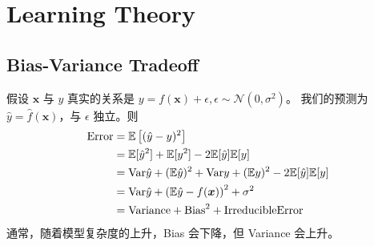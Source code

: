 \chapter{Learning Theory}
	\section{Bias-Variance Tradeoff}
		假设 $ \bm{x} $ 与 $ y $ 真实的关系是 $ y = f(\bm{x}) + \epsilon , \epsilon \sim \mathcal{N}(0, \sigma^2) $。
		我们的预测为 $ \hat{y} = \hat{f}(\bm{x}) $，与 $ \epsilon $ 独立。则
		\begin{align*}
			\text{Error} &= \mathbb{E}\left[ (\hat{y}-y)^2 \right] \\
			&= \mathbb{E}[ \hat{y}^2 ] + \mathbb{E}[y^2] - 2\mathbb{E}[\hat{y}] \mathbb{E}[y] \\
			&= \text{Var} \hat{y} + (\mathbb{E}\hat{y})^2 + \text{Var} y + (\mathbb{E}y)^2 - 2\mathbb{E}[\hat{y}] \mathbb{E}[y] \\
			&= \text{Var} \hat{y} + \left( \mathbb{E}\hat{y} - f(\bm{x}) \right)^2 + \sigma^2 \\
			&= \text{Variance} + \text{Bias}^2 + \text{IrreducibleError}
		\end{align*}
		通常，随着模型复杂度的上升，Bias 会下降，但 Variance 会上升。
		
		